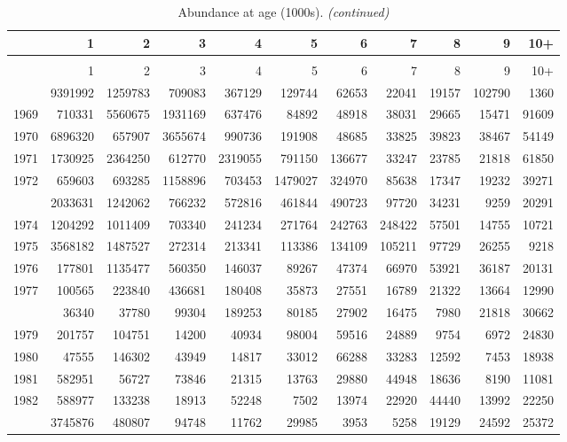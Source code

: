 \documentclass[
]{article}
\begin{document}
\begin{longtable}[t]{lrrrrrrrrrr}
\caption{\label{tab:NAA-table}Abundance at age (1000s).}\\
\toprule
  & 1 & 2 & 3 & 4 & 5 & 6 & 7 & 8 & 9 & 10+\\
\midrule
\endfirsthead
\caption[]{Abundance at age (1000s). \textit{(continued)}}\\
\toprule
  & 1 & 2 & 3 & 4 & 5 & 6 & 7 & 8 & 9 & 10+\\
\midrule
\endhead

\endfoot
\bottomrule
\endlastfoot
1968 & 9391992 & 1259783 & 709083 & 367129 & 129744 & 62653 & 22041 & 19157 & 102790 & 1360\\
1969 & 710331 & 5560675 & 1931169 & 637476 & 84892 & 48918 & 38031 & 29665 & 15471 & 91609\\
1970 & 6896320 & 657907 & 3655674 & 990736 & 191908 & 48685 & 33825 & 39823 & 38467 & 54149\\
1971 & 1730925 & 2364250 & 612770 & 2319055 & 791150 & 136677 & 33247 & 23785 & 21818 & 61850\\
1972 & 659603 & 693285 & 1158896 & 703453 & 1479027 & 324970 & 85638 & 17347 & 19232 & 39271\\
\addlinespace
1973 & 2033631 & 1242062 & 766232 & 572816 & 461844 & 490723 & 97720 & 34231 & 9259 & 20291\\
1974 & 1204292 & 1011409 & 703340 & 241234 & 271764 & 242763 & 248422 & 57501 & 14755 & 10721\\
1975 & 3568182 & 1487527 & 272314 & 213341 & 113386 & 134109 & 105211 & 97729 & 26255 & 9218\\
1976 & 177801 & 1135477 & 560350 & 146037 & 89267 & 47374 & 66970 & 53921 & 36187 & 20131\\
1977 & 100565 & 223840 & 436681 & 180408 & 35873 & 27551 & 16789 & 21322 & 13664 & 12990\\
\addlinespace
1978 & 36340 & 37780 & 99304 & 189253 & 80185 & 27902 & 16475 & 7980 & 21818 & 30662\\
1979 & 201757 & 104751 & 14200 & 40934 & 98004 & 59516 & 24889 & 9754 & 6972 & 24830\\
1980 & 47555 & 146302 & 43949 & 14817 & 33012 & 66288 & 33283 & 12592 & 7453 & 18938\\
1981 & 582951 & 56727 & 73846 & 21315 & 13763 & 29880 & 44948 & 18636 & 8190 & 11081\\
1982 & 588977 & 133238 & 18913 & 52248 & 7502 & 13974 & 22920 & 44440 & 13992 & 22250\\
\addlinespace
1983 & 3745876 & 480807 & 94748 & 11762 & 29985 & 3953 & 5258 & 19129 & 24592 & 25372\\

\end{longtable}
\end{document}
